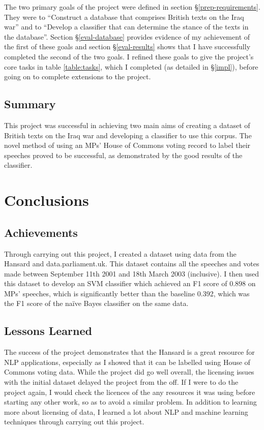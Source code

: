 \documentclass[12pt,a4paper,twoside,openright]{report}
\begin{document}
The two primary goals of the project were defined in section \S\ref{prep-requirements}. They were to ``Construct a database that comprises British texts on the Iraq war'' and to ``Develop a classifier that can determine the stance of the texts in the database''. Section \S\ref{eval-database} provides evidence of my achievement of the first of these goals and section \S\ref{eval-results} shows that I have successfully completed the second of the two goals. I refined these goals to give the project's core tasks in table \ref{table:tasks}, which I completed (as detailed in \S\ref{impl}), before going on to complete extensions to the project.

\section{Summary}

This project was successful in achieving two main aims of creating a dataset of British texts on the Iraq war and developing a classifier to use this corpus. The novel method of using an MPs' House of Commons voting record to label their speeches proved to be successful, as demonstrated by the good results of the classifier.

\chapter{Conclusions} \label{conc}

\section{Achievements}

Through carrying out this project, I created a dataset using data from the Hansard and data.parliament.uk. This dataset contains all the speeches and votes made between September 11th 2001 and 18th March 2003 (inclusive). I then used this dataset to develop an SVM classifier which achieved an F1 score of 0.898 on MPs' speeches, which is significantly better than the baseline 0.392, which was the F1 score of the na\"{i}ve Bayes classifier on the same data.

\section{Lessons Learned}

The success of the project demonstrates that the Hansard is a great resource for NLP applications, especially as I showed that it can be labelled using House of Commons voting data. While the project did go well overall, the licensing issues with the initial dataset delayed the project from the off. If I were to do the project again, I would check the licences of the any resources it was using before starting any other work, so as to avoid a similar problem. In addition to learning more about licensing of data, I learned a lot about NLP and machine learning techniques through carrying out this project.
\end{document}
